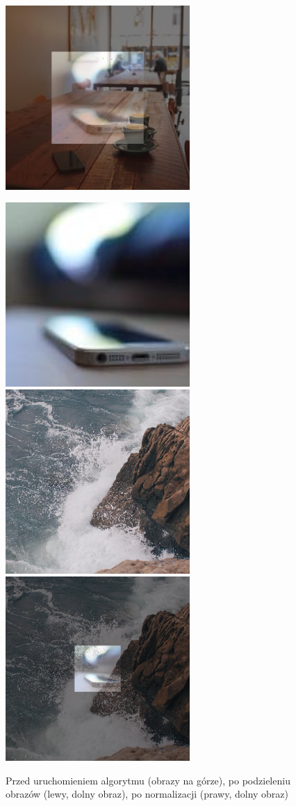 \documentclass[a4paper,12pt]{book}
\begin{document}
\begin{figure}[H]
	\includegraphics[width=7cm, height=7cm]{3-5/divide-color-images-coffee-phone-norm.png}
\end{figure}
\begin{figure}[H]
	\caption{Przed uruchomieniem algorytmu (obrazy na górze), po podzieleniu obrazów (lewy, dolny obraz), po normalizacji (prawy, dolny obraz)}
	\includegraphics[width=7cm, height=7cm]{phone-unmodified.jpg}
	\includegraphics[width=7cm, height=7cm]{sea-unmodified.jpg}
	\includegraphics[width=7cm, height=7cm]{3-5/divide-color-images-phone-sea.png}

\end{figure}
\end{document}
